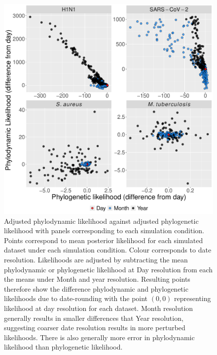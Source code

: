 \documentclass[12pt]{article}
\begin{document}
\begin{figure}[H]
    \centering
    \includegraphics[width=\textwidth]{simulation_likelihood.pdf}
    \caption{Adjusted phylodynamic likelihood against adjusted phylogenetic likelihood with panels corresponding to each simulation condition. Points correspond to mean posterior likelihood for each simulated dataset under each simulation condition. Colour corresponds to date resolution. Likelihoods are adjusted by subtracting the mean phylodynamic or phylogenetic likelihood at Day resolution from each the means under Month and year resolution. Resulting points therefore show the difference phylodynamic and phylogenetic likelihoods due to date-rounding with the point $(0, 0)$ representing likelihood at day resolution for each dataset. Month resolution generally results in smaller differences that Year resolution, suggesting coarser date resolution results in more perturbed likelihoods. There is also generally more error in phylodynamic likelihood than phylogenetic likelihood.}
    \label{fig:sim-likeihood}
\end{figure}
\end{document}
